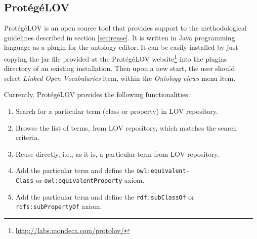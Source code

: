 \subsection{Prot{\'e}g{\'e}LOV}\label{sec:protegelov}
Prot{\'e}g{\'e}LOV is an open source tool that provides support to the methodological guidelines described in section \ref{sec:reuse}. It is written in Java programming language as a plugin for the \protege ontology editor. It can be easily installed by just copying the jar file provided at the Prot{\'e}g{\'e}LOV website\footnote{\url{http://labs.mondeca.com/protolov/}} into the plugins directory of an existing \protege installation. Then upon a new start, the user should select \emph{Linked Open Vocabularies} item, within the \emph{Ontology views} menu item.

Currently, Prot{\'e}g{\'e}LOV provides the following functionalities: 

\begin{enumerate}
\item Search for a particular term (class or property) in LOV repository. 
\item Browse the list of terms, from LOV repository, which matches the search criteria. 
\item Reuse directly, i.e., as it is, a particular term from LOV repository.
\item Add the particular term and define the {\tt owl:equivalent-}\\{\tt Class} or {\tt owl:equivalentProperty} axiom.
\item Add the particular term and define the {\tt rdf:subClassOf} or {\tt rdfs:subPropertyOf} axiom. 
\end{enumerate}

